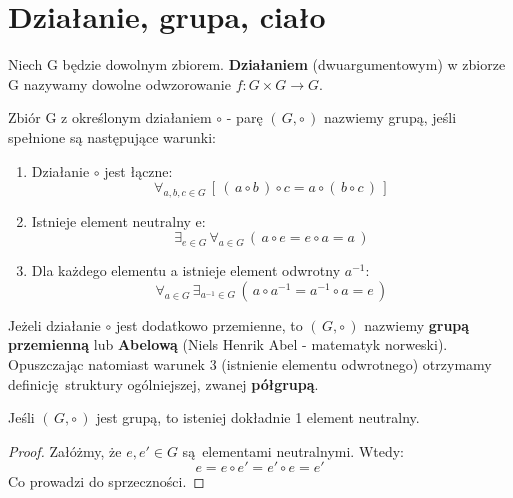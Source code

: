 \section{Działanie, grupa, ciało}
\begin{definition}
    Niech G będzie dowolnym zbiorem. \textbf{Działaniem} (dwuargumentowym) w zbiorze G nazywamy dowolne odwzorowanie $f: G \times G \rightarrow G$.
\end{definition}

\begin{definition}
    Zbiór G z określonym działaniem $\circ$ - parę $(\,G, \circ\,)$ nazwiemy grupą, jeśli spełnione są następujące warunki:
    \begin{enumerate}
        \item Działanie $\circ$ jest łączne: 
            \begin{equation*}
                \forall_{a,b,c \in G} \, [\,(\,a \circ b\,) \circ c = a \circ (\,b \circ c\,)\,]
            \end{equation*}
        \item Istnieje element neutralny e:
            \begin{equation*}
                \exists_{e \in G} \, \forall_{a \in G} \, (\,a \circ e = e \circ a = a\,)
            \end{equation*}
        \item Dla każdego elementu a istnieje element odwrotny $a^{-1}$:
            \begin{equation*}
                \forall_{a \in G} \, \exists_{a^{-1} \in G} \, (\,a \circ a^{-1} = a^{-1} \circ a = e\,)
            \end{equation*}
    \end{enumerate}
    Jeżeli działanie $\circ$ jest dodatkowo przemienne, to $(\, G, \circ\,)$ nazwiemy \textbf{grupą przemienną} lub \textbf{Abelową} (Niels Henrik Abel - matematyk norweski). Opuszczając natomiast warunek 3 (istnienie elementu odwrotnego) otrzymamy definicję struktury ogólniejszej, zwanej \textbf{półgrupą}. 
\end{definition}

\begin{theorem}
    Jeśli $(\,G, \circ \,)$ jest grupą, to isteniej dokładnie 1 element neutralny.
\end{theorem}

\begin{proof}
    Załóżmy, że $e, e' \in G$ są elementami neutralnymi. Wtedy:
    \begin{equation*}
        e = e \circ e' = e' \circ e = e'
    \end{equation*}
    Co prowadzi do sprzeczności.
\end{proof}

